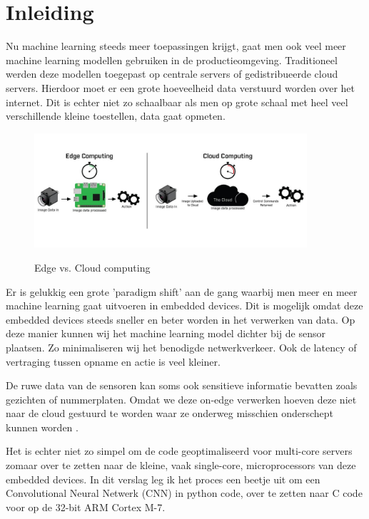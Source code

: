 \section{Inleiding}

Nu machine learning steeds meer toepassingen krijgt, gaat men ook veel meer machine learning modellen gebruiken in de productieomgeving.
Traditioneel werden deze modellen toegepast op centrale servers of gedistribueerde cloud servers. Hierdoor moet er een grote hoeveelheid data verstuurd worden over het internet.
Dit is echter niet zo schaalbaar als men op grote schaal met heel veel verschillende kleine toestellen, data gaat opmeten. %

\begin{figure}[ht]
	\centering
	\includegraphics[width=0.9\textwidth]{figuren/iisedgecomputing.jpg}
	\caption{Edge vs. Cloud computing}
	\cite{flir-edge-computing}
	\label{fig:edge-vs-cloud}
  \end{figure}


Er is gelukkig een grote 'paradigm shift' aan de gang waarbij men meer en meer machine learning gaat uitvoeren in embedded devices.
Dit is mogelijk omdat deze embedded devices steeds sneller en beter worden in het verwerken van data.
Op deze manier kunnen wij het machine learning model dichter bij de sensor plaatsen. Zo minimaliseren wij het benodigde netwerkverkeer.
Ook de latency of vertraging tussen opname en actie is veel kleiner. \cite{flir-edge-computing}

De ruwe data van de sensoren kan soms ook sensitieve informatie bevatten zoals gezichten of nummerplaten. Omdat we deze on-edge verwerken hoeven deze niet naar de cloud gestuurd te worden waar ze onderweg misschien onderschept kunnen worden \cite{flir-edge-computing}.

Het is echter niet zo simpel om de code geoptimaliseerd voor multi-core servers zomaar over te zetten naar de kleine, vaak single-core, microprocessors van deze embedded devices. In dit verslag leg ik het proces een beetje uit om een Convolutional Neural Netwerk (CNN) in python code, over te zetten naar C code voor op de 32-bit ARM Cortex M-7.

